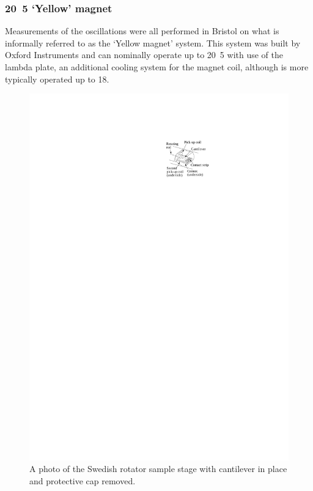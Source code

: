 
\subsubsection{\unit{20.5}{\tesla} `Yellow' magnet}
    \label{Sec:Exp:YellowMagnet}

Measurements of the oscillations were all performed in Bristol on what is informally referred to as the `Yellow magnet' system. This system was built by Oxford Instruments and can nominally operate up to \unit{20.5}{\tesla} with use of the lambda plate, an additional cooling system for the magnet coil, although is more typically operated up to \unit{18}{\tesla}.
\begin{figure}[htbp]
    \begin{center}
        \includegraphics[scale=1.1]{Chapter-ExperimentalTechnique/Figures/SampleStageSchematic/SampleStageSchematic}
        \caption{A photo of the Swedish rotator sample stage with cantilever in place and protective cap removed.}
        \label{Fig:Exp:SampleStageSchematic}
    \end{center}
\end{figure}
